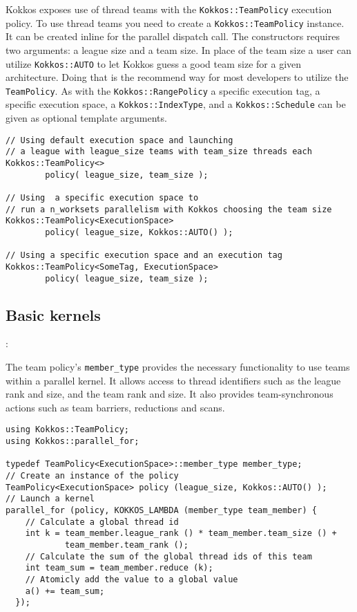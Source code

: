 \begin{enumerate}
Kokkos exposes use of thread teams with the \lstinline!Kokkos::TeamPolicy! execution policy.
To use thread teams you need to create a \lstinline|Kokkos::TeamPolicy| instance.
It can be created inline for the parallel dispatch call.
The constructors requires two arguments: a league size and a team size. 
In place of the team size a user can utilize \lstinline|Kokkos::AUTO| to let Kokkos guess a good team size for a given architecture.
Doing that is the recommend way for most developers to utilize the \lstinline|TeamPolicy|.
As with the  \lstinline|Kokkos::RangePolicy| a specific execution tag, a specific execution space, a \lstinline|Kokkos::IndexType|, and a \lstinline|Kokkos::Schedule| can be given as optional template arguments.
\begin{lstlisting}
// Using default execution space and launching 
// a league with league_size teams with team_size threads each
Kokkos::TeamPolicy<> 
        policy( league_size, team_size ); 

// Using  a specific execution space to 
// run a n_worksets parallelism with Kokkos choosing the team size
Kokkos::TeamPolicy<ExecutionSpace> 
        policy( league_size, Kokkos::AUTO() );

// Using a specific execution space and an execution tag 
Kokkos::TeamPolicy<SomeTag, ExecutionSpace> 
        policy( league_size, team_size ); 
\end{lstlisting}


\subsection{Basic kernels}\label{SS:Hierarchical:Teams:Kernels}:

The team policy's \lstinline!member_type! provides the necessary functionality to use teams within a parallel kernel.
It allows access to thread identifiers such as the league rank and size, and the team rank and size.
It also provides team-synchronous actions such as team barriers, reductions and scans.
\begin{lstlisting}
using Kokkos::TeamPolicy;
using Kokkos::parallel_for;

typedef TeamPolicy<ExecutionSpace>::member_type member_type;
// Create an instance of the policy
TeamPolicy<ExecutionSpace> policy (league_size, Kokkos::AUTO() );
// Launch a kernel
parallel_for (policy, KOKKOS_LAMBDA (member_type team_member) {
    // Calculate a global thread id
    int k = team_member.league_rank () * team_member.team_size () +
            team_member.team_rank ();
    // Calculate the sum of the global thread ids of this team
    int team_sum = team_member.reduce (k);
    // Atomicly add the value to a global value
    a() += team_sum;
  });
\end{lstlisting}


\end{enumerate}
